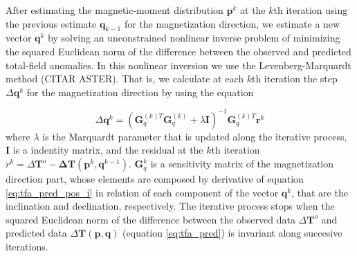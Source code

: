 After estimating the magnetic-moment distribution $\mathbf{p}^k$ at the $k$th iteration using the previous estimate $\mathbf{q}_{k-1}$ for the magnetization direction, we estimate a new vector $\mathbf{q}^{k}$ by solving an unconstrained nonlinear inverse problem of minimizing the squared Euclidean norm of the difference between the observed and predicted total-field anomalies. In this nonlinear inversion we use the Levenberg-Marquardt method (CITAR ASTER). That is, we calculate at each $k$th iteration the step $\Delta \mathbf{q}^k$ for the magnetization direction by using the equation

\begin{equation}
	\Delta \mathbf{q}^k = (\mathbf{G}_{q}^{(k)T} \mathbf{G}_{q}^{(k)} + \lambda \mathbf{I})^{-1} \mathbf{G}_{q}^{(k)T}  \mathbf{r}^k
	\label{eq:linsys_q}
\end{equation}
where $\lambda$ is the Marquardt parameter that is updated along the iterative process, $\mathbf{I}$ is a indentity matrix, and  the residual at the $k$th iteration $r^k = \Delta \mathbf{T}^o - \mathbf{\Delta T} (\mathbf{p}^k, \mathbf{q}^{k-1})$. $\mathbf{G}_q^k$ is a sensitivity matrix of the magnetization direction part, whose elements are composed by derivative of equation \ref{eq:tfa_pred_pos_i} in relation of each component of the vector $\mathbf{q}^k$, that are the inclination and declination, respectively. The iterative process stops when the squared Euclidean norm of the difference between the observed data $\Delta \mathbf{T}^{o}$ and predicted data $\Delta\mathbf{T}(\mathbf{p}, \mathbf{q})$ (equation \ref{eq:tfa_pred}) is invariant along succesive iterations.

